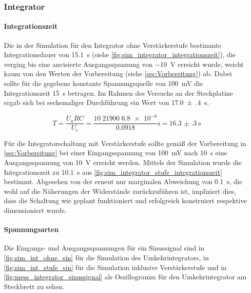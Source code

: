 \documentclass[12pt,english,ngerman]{scrartcl}
\begin{document}
\subsubsection{Integrator}
\paragraph{Integrationszeit}
Die in der Simulation für den Integrator ohne Verstärkerstufe bestimmte
Integrationsdauer von \SI{15,1}{\second} (siehe
\autoref{fig:sim_integrator_integrationszeit}), die verging bis eine anvisierte
Ausgangsspannung von \SI{-10}{\volt} erreicht wurde, weicht kaum von den Werten
der Vorbereitung (siehe \autoref{sec:Vorbereitung}) ab. Dabei sollte für die
gegebene konstante Spannungsquelle von \SI{100}{\milli\volt} die
Integrationszeit \SI{15}{\second} betragen. Im Rahmen des Versuchs an der
Steckplatine ergab sich bei sechsmaliger Durchführung ein Wert von
\SI{17.0(4)}{\second}.

\begin{equation}
  T = \frac{U_{a}RC}{U_e} = \frac{\num{10}\; \num{21900} \; \num{6.8e-6}}{\num{0.0918}}\si{\second} = \SI{16.3(3)}{\second}
  \label{eq:theo_angepasst}
\end{equation}

Für die Integratorschaltung mit Verstärkerstufe sollte gemäß der Vorbereitung
in \autoref{sec:Vorbereitung} bei einer Eingangsspannung von
\SI{100}{\milli\volt} nach \SI{10}{\second} eine Ausgangsspannung von
\SI{10}{\volt} erreicht werden. Mittels der Simulation wurde die
Integrationszeit zu \SI{10,1}{\second} aus
\autoref{fig:sim_integrator_stufe_integrationszeit} bestimmt. Abgesehen von der
erneut nur marginalen Abweichung von \SI{0,1}{\second}, die wohl auf die
Näherungen der Widerstände zurückzuführen ist, impliziert dies, dass die
Schaltung wie geplant funktioniert und erfolgreich konstruiert respektive
dimensioniert wurde.

\paragraph{Spannungsarten}
Die Eingangs- und Ausgangsspannungen für ein Sinussignal sind in \autoref{fig:sim_int_ohne_sin} für
die Simulation des Umkehrintegrators, in \autoref{fig:sim_int_stufe_sin} für die Simulation
inklusive Verstärkerstufe und in \autoref{fig:mess_integrator_sinussignal} als Oszillogramm für den
Umkehrintegrator am Steckbrett zu sehen.
\end{document}
